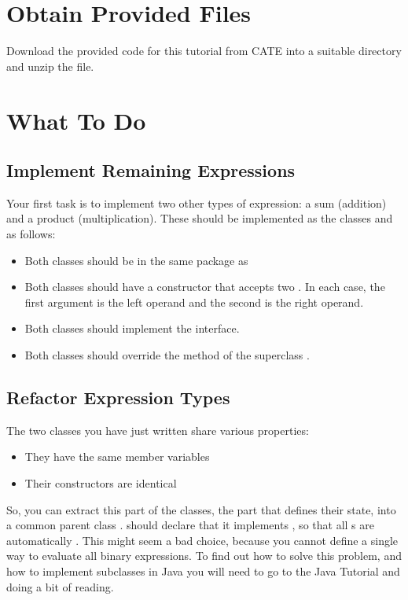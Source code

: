 \documentclass[11pt,a4paper]{article}
\begin{document}
\section{Obtain Provided Files}

Download the provided code for this tutorial from CATE into a suitable
directory and unzip the file.

\section {What To Do}

\subsection{Implement Remaining Expressions}

Your first task is to implement two other types of expression: a sum (addition)
and a product (multiplication).
These should be implemented as the classes  and 
as follows:

\begin{itemize}
  \item Both classes should be in the same package as 
  \item Both classes should have a constructor that accepts two 
    .
    In each case, the first argument is the left operand and the second
    is the right operand.
  \item Both classes should implement the  interface.
  \item Both classes should override the  method of the 
  superclass .
\end{itemize}


\subsection{Refactor Expression Types}

The two classes you have just written share various properties:

\begin{itemize}
  \item They have the same member variables
  \item Their constructors are identical
\end{itemize}

So, you can extract this part of the classes, 
the part that defines their state, into a common parent class 
.
 should declare that it implements ,
so that all s are automatically .
This might seem a bad choice, because you cannot define 
a single way to evaluate all binary expressions.
To find out how to solve this problem, and how to implement subclasses in Java
you will need to go to the Java Tutorial and doing a bit of reading.
\end{document}
